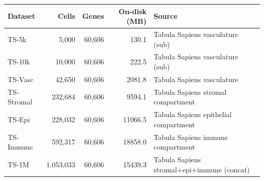 \begin{tabular}{lrrrl}
\toprule
Dataset & Cells & Genes & On-disk (MB) & Source \\
\midrule
TS-5k & 5,000 & 60,606 & 130.1 & Tabula Sapiens vasculature (sub) \\
TS-10k & 10,000 & 60,606 & 222.5 & Tabula Sapiens vasculature (sub) \\
TS-Vasc & 42,650 & 60,606 & 2081.8 & Tabula Sapiens vasculature \\
TS-Stromal & 232,684 & 60,606 & 9594.1 & Tabula Sapiens stromal compartment \\
TS-Epi & 228,032 & 60,606 & 11066.5 & Tabula Sapiens epithelial compartment \\
TS-Immune & 592,317 & 60,606 & 18858.0 & Tabula Sapiens immune compartment \\
TS-1M & 1,053,033 & 60,606 & 15439.3 & Tabula Sapiens stromal+epi+immune (concat) \\
\bottomrule
\end{tabular}